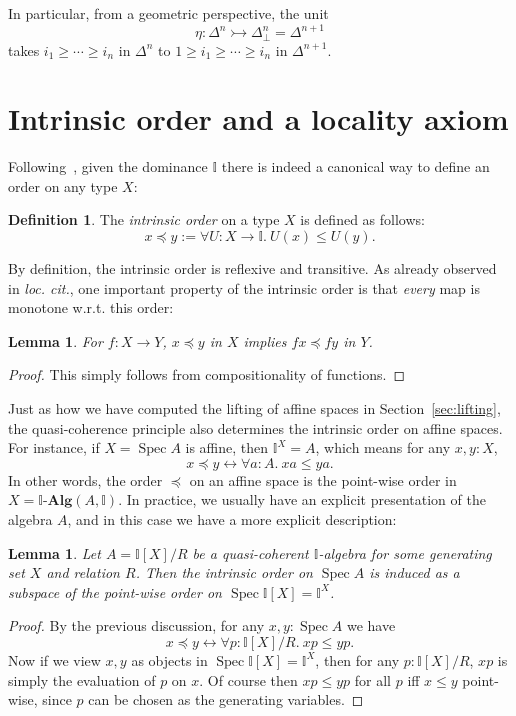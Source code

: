 \documentclass[12pt]{amsart}
\newtheorem{lemma}[theorem]{Lemma}
\theoremstyle{definition}
\newtheorem{definition}[theorem]{Definition}
\newcommand{\mb}[1]{\mathbf{#1}}
\newcommand{\mbb}[1]{\mathbb{#1}}
\newcommand{\I}{\mbb I}
\newcommand{\alg}{\text{-}\mb{Alg}}
\newcommand{\inj}{\rightarrowtail}
\newcommand{\prt}{_{\bot}}
\newcommand{\fa}[2]{\forall #1\!\colon\!\!#2.\ }
\newcommand{\eq}{\leftrightarrow}
\newcommand{\spec}{\operatorname{Spec}}
\begin{document}
In particular, from a geometric perspective, the unit
\[ \eta : \Delta^n \inj \Delta^n\prt = \Delta^{n+1} \]
takes $i_1 \ge \cdots \ge i_n$ in $\Delta^n$ to $1 \ge i_1 \ge \cdots \ge i_n$ in $\Delta^{n+1}$. 

\section{Intrinsic order and a locality axiom}\label{sec:local}

Following~\cite{hyland2006first}, given the dominance $\I$ there is indeed a canonical way to define an order on any type $X$:

\begin{definition}
  The \emph{intrinsic order} on a type $X$ is defined as follows:
  \[ x \preceq y := \fa{U}{X\to\I} U(x) \le U(y). \]
\end{definition}

By definition, the intrinsic order is reflexive and transitive. As already observed in \emph{loc. cit.}, one important property of the intrinsic order is that \emph{every} map is monotone w.r.t. this order:

\begin{lemma}\label{lem:anymapmonotoneintriscorder}
  For $f : X \to Y$, $x \preceq y$ in $X$ implies $fx \preceq fy$ in $Y$.
\end{lemma}
\begin{proof}
  This simply follows from compositionality of functions.
\end{proof}

Just as how we have computed the lifting of affine spaces in Section~\ref{sec:lifting}, the quasi-coherence principle also determines the intrinsic order on affine spaces. For instance, if $X = \spec A$ is affine, then $\I^X = A$, which means for any $x,y : X$,
\[ x \preceq y \eq \fa aA xa \le ya. \]
In other words, the order $\preceq$ on an affine space is the point-wise order in $X = \I\alg(A,\I)$. In practice, we usually have an explicit presentation of the algebra $A$, and in this case we have a more explicit description:

\begin{lemma}\label{lem:orderonaffine}
  Let $A = \I[X]/R$ be a quasi-coherent $\I$-algebra for some generating set $X$ and relation $R$. Then the intrinsic order on $\spec A$ is induced as a subspace of the point-wise order on $\spec\I[X] = \I^X$.
\end{lemma}
\begin{proof}
  By the previous discussion, for any $x,y : \spec A$ we have
  \[ x \preceq y \eq \fa p{\I[X]/R} xp \le yp. \]
  Now if we view $x,y$ as objects in $\spec \I[X] = \I^X$, then for any $p : \I[X]/R$, $xp$ is simply the evaluation of $p$ on $x$. Of course then $xp \le yp$ for all $p$ iff $x \le y$ point-wise, since $p$ can be chosen as the generating variables.
\end{proof}
\end{document}
